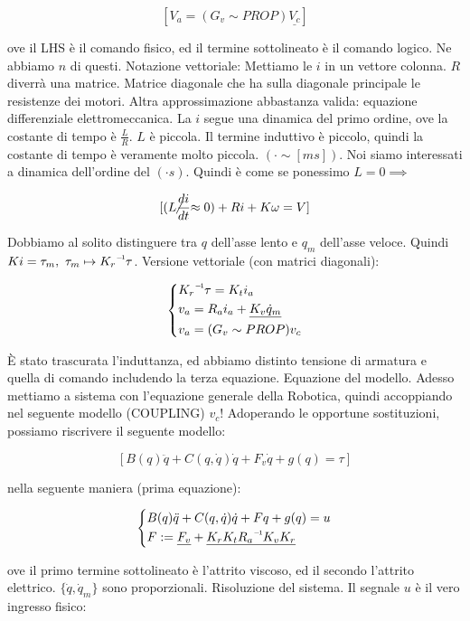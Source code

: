 \[
	[V_a = (G_v\sim PROP)\underline{V_c}]
\]

ove il LHS è il comando fisico, ed il termine sottolineato è il comando logico. Ne abbiamo $n$ di questi. Notazione vettoriale: Mettiamo le $i$ in un vettore colonna. $R$ diverrà una matrice. Matrice diagonale che ha sulla diagonale principale le resistenze dei motori. Altra approssimazione abbastanza valida: equazione differenziale elettromeccanica. La $i$ segue una dinamica del primo ordine, ove la costante di tempo è $\frac{L}{R}$. $L$ è piccola. Il termine induttivo è piccolo, quindi la costante di tempo è veramente molto piccola. $(\mathord{\cdot}\sim [ms])$. Noi siamo interessati a dinamica dell'ordine del $(\mathord{\cdot}s)$. Quindi è come se ponessimo $L=0 \implies$

\[
	[(\centernot{L\frac{di}{dt}}\approx 0) + Ri + K\omega = V]
\]

Dobbiamo al solito distinguere tra $q$ dell'asse lento e $q_m$ dell'asse veloce. Quindi $Ki=\tau_m,\ \tau_m\mapsto \inv{K_r}\tau$. Versione vettoriale (con matrici diagonali):

\[
	\left\{
	\begin{aligned}
	&\inv{K_r}\tau = K_ti_a\\
	&v_a = R_ai_a + \underline{K_v\dot{q}_m}\\
	&v_a = (G_v\sim PROP)v_c
	\end{aligned}
	\right.
\]

\`E stato trascurata l'induttanza, ed abbiamo distinto tensione di armatura e quella di comando includendo la terza equazione. Equazione del modello. Adesso mettiamo a sistema con l'equazione generale della Robotica, quindi accoppiando nel seguente modello (COUPLING) $v_c$! Adoperando le opportune sostituzioni, possiamo riscrivere il seguente modello:

\[
	[B(q)\ddot{q} + C(q,\dot{q})\dot{q} + F_v\dot{q} + g(q) = \tau]
\]

nella seguente maniera (prima equazione):

\[
	\left\{
	\begin{aligned}
	&B(q)\ddot{q} + C(q,\dot{q})\dot{q} + Fq + g(q) = u\\
	&F := \underline{F_v} + \underline{K_rK_t\inv{R_a}K_vK_r}
	\end{aligned}
	\right.
\]

ove il primo termine sottolineato è l'attrito viscoso, ed il secondo l'attrito elettrico. $\{\dot{q},\dot{q}_m\}$ sono proporzionali. Risoluzione del sistema. Il segnale $u$ è il vero ingresso fisico:

